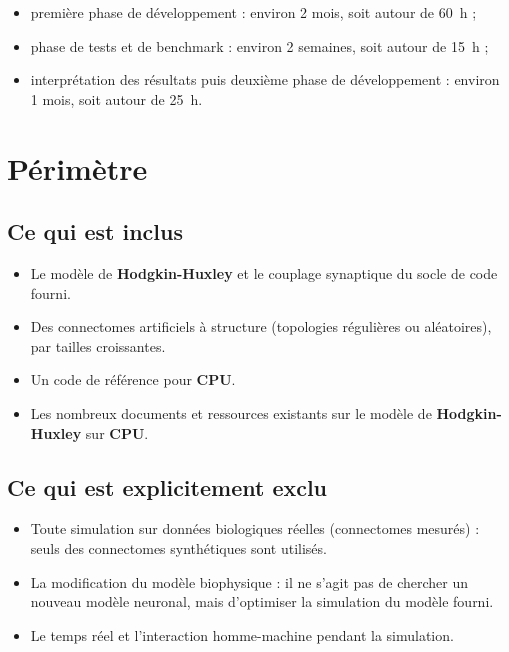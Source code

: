 \begin{itemize}
    \item première phase de développement : environ 2 mois, soit autour de 60~h ;

    \item phase de tests et de benchmark : environ 2 semaines, soit autour de 15~h ;

    \item interprétation des résultats puis deuxième phase de développement : environ 1 mois, soit autour de 25~h.
\end{itemize}

\chapter{Périmètre}

\section{Ce qui est inclus}

\begin{itemize}
    \item Le modèle de \textbf{Hodgkin-Huxley} et le couplage synaptique du socle de code fourni.
    \item Des connectomes artificiels à structure (topologies régulières ou aléatoires), par tailles croissantes.
    \item Un code de référence pour \textbf{CPU}.
    \item Les nombreux documents et ressources existants sur le modèle de \textbf{Hodgkin-Huxley} sur \textbf{CPU}.
\end{itemize}

\section{Ce qui est explicitement exclu}

\begin{itemize}
    \item Toute simulation sur données biologiques réelles (connectomes mesurés) : seuls des connectomes synthétiques sont utilisés.
    \item La modification du modèle biophysique : il ne s'agit pas de chercher un nouveau modèle neuronal, mais d'optimiser la simulation du modèle fourni.
    \item Le temps réel et l'interaction homme-machine pendant la simulation.
\end{itemize}

